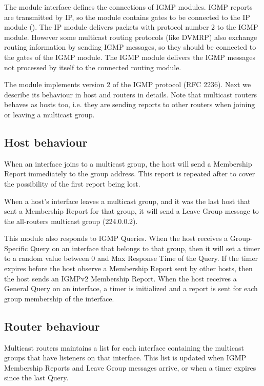 The  module interface defines the connections
of IGMP modules.
IGMP reports are transmitted by IP, so the module contains
gates to be connected to the IP module (). The IP
module delivers packets with protocol number 2 to the IGMP module.
However some multicast routing protocols (like DVMRP) also exchange
routing information by sending IGMP messages, so they should be
connected to the  gates of the IGMP module.
The IGMP module delivers the IGMP messages not processed by itself
to the connected routing module.

The  module implements version 2 of the IGMP protocol
(RFC 2236). Next we describe its behaviour in host and routers in details.
Note that multicast routers behaves as hosts too, i.e. they are sending
reports to other routers when joining or leaving a multicast group.

\subsection{Host behaviour}

When an interface joins to a multicast group, the host
will send a Membership Report immediately to the group address.
This report is repeated after  to
cover the possibility of the first report being lost.

When a host's interface leaves a multicast group, and it was
the last host that sent a Membership Report for that group,
it will send a Leave Group message to the all-routers multicast
group (224.0.0.2).

This module also responds to IGMP Queries. When the host
receives a Group-Specific Query on an interface that belongs
to that group, then it will set a timer to a random value
between 0 and Max Response Time of the Query. If the timer
expires before the host observe a Membership Report sent
by other hosts, then the host sends an IGMPv2 Membership Report.
When the host receives a General Query on an interface,
a timer is initialized and a report is sent for each group
membership of the interface.

\subsection{Router behaviour}

Multicast routers maintains a list for each interface containing
the multicast groups that have listeners on that interface.
This list is updated when IGMP Membership Reports and Leave Group
messages arrive, or when a timer expires since the last Query.

